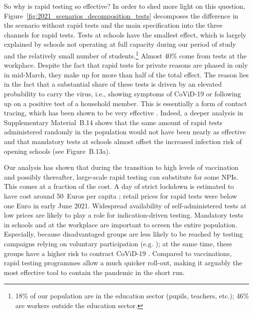 \documentclass[12pt]{article}
\begin{document}
So why is rapid testing so effective? In order to shed more light on this question,
Figure~\ref{fig:2021_scenarios_decomposition_tests} decomposes the difference in the
scenario without rapid tests and the main specification into the three channels for
rapid tests. Tests at schools have the smallest effect, which is largely explained by
schools not operating at full capacity during our period of study and the relatively
small number of students.\footnote{18\% of our population are in the education sector
(pupils, teachers, etc.); 46\% are workers outside the education sector.} Almost 40\%
come from tests at the workplace. Despite the fact that rapid tests for private reasons
are phased in only in mid-March, they make up for more than half of the total effect.
The reason lies in the fact that a substantial share of these tests is driven by an
elevated probability to carry the virus, i.e., showing symptoms of CoViD-19 or following
up on a positive test of a household member. This is essentially a form of contact
tracing, which has been shown to be very effective \cite{Contreras2021,
Fetzer2021,Kretzschmar2020}. Indeed, a deeper analysis in Supplementary Material~B.14
shows that the same amount of rapid tests administered randomly in the population would
not have been nearly as effective and that mandatory tests at schools almost offset the
increased infection risk of opening schools (see Figure~B.13a).

Our analysis has shown that during the transition to high levels of vaccination and
possibly thereafter, large-scale rapid testing can substitute for some NPIs. This comes
at a fraction of the cost. A day of strict lockdown is estimated to have cost around
50~Euros per capita \cite{Dorn2020b}; retail prices for rapid tests were below one Euro
in early June 2021. Widespread availability of self-administered tests at low prices are
likely to play a role for indication-driven testing. Mandatory tests in schools and at
the workplace are important to screen the entire population. Especially, because
disadvantaged groups are less likely to be reached by testing campaigns relying on
voluntary participation (e.g. \cite{StillmanTonin2021}); at the same time, these groups
have a higher risk to contract CoViD-19 \cite{KochInstitut2021a}. Compared to
vaccinations, rapid testing programmes allow a much quicker roll-out, making it arguably
the most effective tool to contain the pandemic in the short run.

% 
% 
\end{document}
